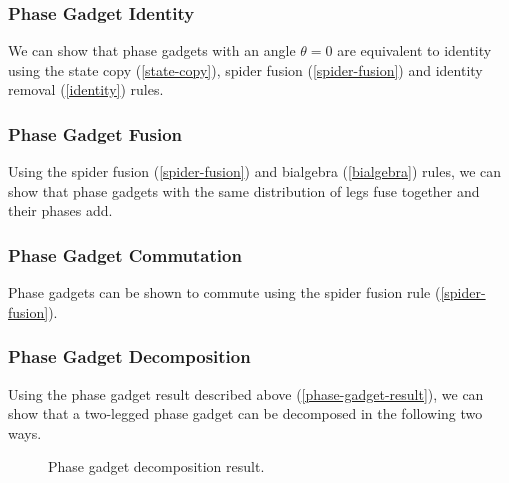 
\subsubsection{Phase Gadget Identity}%

We can show that phase gadgets with an angle $\theta = 0$ are equivalent to identity using the state copy (\ref{state-copy}), spider fusion (\ref{spider-fusion}) and identity removal (\ref{identity}) rules.



\subsubsection{Phase Gadget Fusion}%
\label{phase-gadget-fusion}
Using the spider fusion (\ref{spider-fusion}) and bialgebra (\ref{bialgebra}) rules, we can show that phase gadgets with the same distribution of legs fuse together and their phases add.



\subsubsection{Phase Gadget Commutation}%
\label{phase-gadget-commutation}

Phase gadgets can be shown to commute using the spider fusion rule (\ref{spider-fusion}).



\subsubsection{Phase Gadget Decomposition}%

Using the phase gadget result described above (\ref{phase-gadget-result}), we can show that a two-legged phase gadget can be decomposed in the following two ways.

\begin{figure}[H]
    \centering
    \caption{Phase gadget decomposition result.}
    \label{phase-gadget-decomposition}
\end{figure}

